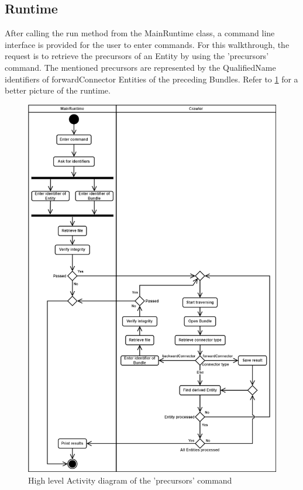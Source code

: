 \documentclass[
  digital,     %
  oneside,     %
  nosansbold,  %
  nocolorbold, %
  lof,         %
  lot,         %
]{fithesis4}
\begin{document}
\subsection{Runtime}
After calling the run method from the MainRuntime class, a command line interface is provided for the user to enter commands. For this walkthrough, the request is to retrieve the precursors of an Entity by using the 'precursors' command. The mentioned precursors are represented by the QualifiedName identifiers of forwardConnector Entities of the preceding Bundles. Refer to \ref{fig:runtime} for a better picture of the runtime.

\begin{figure}[htbp]
  \begin{center}
    \includegraphics[width=12cm]{fithesis/images/precursorsactivity.png}
  \end{center}
  \caption{High level Activity diagram of the 'precursors' command}
  \label{fig:runtime}
\end{figure}
 
\end{document}
